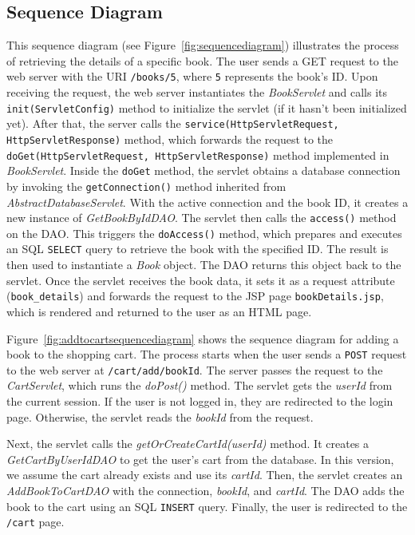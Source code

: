 \subsection{Sequence Diagram}

This sequence diagram (see Figure~\ref{fig:sequencediagram}) illustrates the process of retrieving the details of a specific book.
The user sends a GET request to the web server with the URI \texttt{/books/5}, where \texttt{5} represents the book's ID. Upon receiving the request, the web server instantiates the \textit{BookServlet} and calls its \texttt{init(ServletConfig)} method to initialize the servlet (if it hasn't been initialized yet). After that, the server calls the \texttt{service(HttpServletRequest, HttpServletResponse)} method, which forwards the request to the \texttt{doGet(HttpServletRequest, HttpServletResponse)} method implemented in \textit{BookServlet}.
Inside the \texttt{doGet} method, the servlet obtains a database connection by invoking the \texttt{getConnection()} method inherited from \textit{AbstractDatabaseServlet}. With the active connection and the book ID, it creates a new instance of \textit{GetBookByIdDAO}.
The servlet then calls the \texttt{access()} method on the DAO. This triggers the \texttt{doAccess()} method, which prepares and executes an SQL \texttt{SELECT} query to retrieve the book with the specified ID. The result is then used to instantiate a \textit{Book} object. The DAO returns this object back to the servlet.
Once the servlet receives the book data, it sets it as a request attribute (\verb|book_details|) and forwards the request to the JSP page \texttt{bookDetails.jsp}, which is rendered and returned to the user as an HTML page.


Figure~\ref{fig:addtocartsequencediagram} shows the sequence diagram for adding a book to the shopping cart. The process starts when the user sends a \texttt{POST} request to the web server at \texttt{/cart/add/{bookId}}. The server passes the request to the \textit{CartServlet}, which runs the \textit{doPost()} method. The servlet gets the \textit{userId} from the current session. If the user is not logged in, they are redirected to the login page. Otherwise, the servlet reads the \textit{bookId} from the request.

Next, the servlet calls the \textit{getOrCreateCartId(userId)} method. It creates a \textit{GetCartByUserIdDAO} to get the user's cart from the database. In this version, we assume the cart already exists and use its \textit{cartId}. Then, the servlet creates an \textit{AddBookToCartDAO} with the connection, \textit{bookId}, and \textit{cartId}. The DAO adds the book to the cart using an SQL \texttt{INSERT} query. Finally, the user is redirected to the \texttt{/cart} page.

